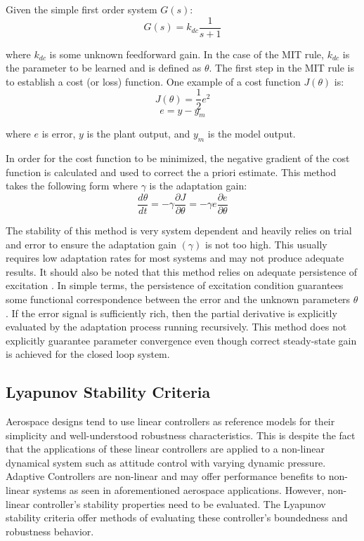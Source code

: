 Given the simple first order system $G(s)$:
\begin{equation}
G(s) = k_{dc}\frac{1}{s+1}
\end{equation}

where $k_{dc}$ is some unknown feedforward gain.  In the case of the MIT rule, $k_{dc}$ is the parameter to be learned and is defined as $\theta$.  The first step in the MIT rule is to establish a cost (or loss) function.  One example of a cost function $J(\theta)$ is:
\begin{equation}
J(\theta) = \frac{1}{2}e^2
\end{equation}
\begin{equation}
e=y-y_m
\end{equation}

where $e$ is error, $y$ is the plant output, and $y_m$ is the model output.

In order for the cost function to be minimized, the negative gradient of the cost function is calculated and used to correct the a priori estimate.  This method takes the following form where $\gamma$ is the adaptation gain:
\begin{equation}
\frac{d\theta}{dt}=-\gamma \frac{\partial{J}}{\partial{\theta}} =-\gamma e\frac{\partial{e}}{\partial{\theta}}
\end{equation}

The stability of this method is very system dependent and heavily relies on trial and error to ensure the adaptation gain $(\gamma)$ is not too high.  This usually requires low adaptation rates for most systems and may not produce adequate results.  It should also be noted that this method relies on adequate persistence of excitation \cite{aastrom2013adaptive}.  In simple terms, the persistence of excitation condition guarantees some functional correspondence between the error and the unknown parameters $\theta$. If the error signal is sufficiently rich, then the partial derivative is explicitly evaluated by the adaptation process running recursively.  This method does not explicitly guarantee parameter convergence even though correct steady-state gain is achieved for the closed loop system.

\subsection{Lyapunov Stability Criteria}

Aerospace designs tend to use linear controllers as reference models for their simplicity and well-understood robustness characteristics.  This is despite the fact that the applications of these linear controllers are applied to a non-linear dynamical system such as attitude control with varying dynamic pressure.  Adaptive Controllers are non-linear and may offer performance benefits to non-linear systems as seen in aforementioned aerospace applications.  However, non-linear controller's stability properties need to be evaluated.  The Lyapunov stability criteria offer methods of evaluating these controller's boundedness and robustness behavior.

